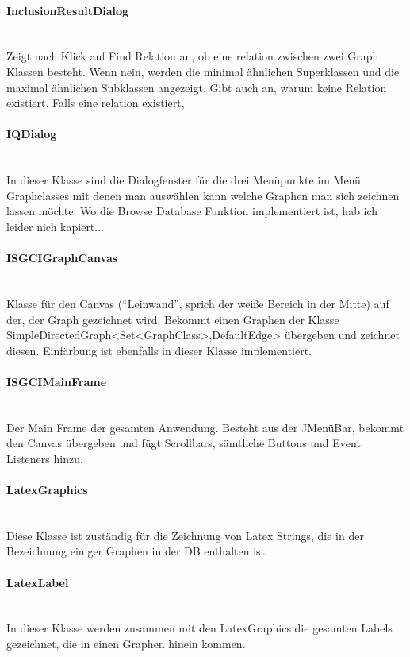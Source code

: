 \documentclass[10pt,a4paper]{article}
\begin{document}
\paragraph{InclusionResultDialog}\ \\Zeigt nach Klick auf Find Relation an, ob eine relation zwischen zwei Graph Klassen besteht. Wenn nein, werden die minimal ähnlichen Superklassen und die maximal ähnlichen Subklassen angezeigt. Gibt auch an, warum keine Relation existiert. Falls eine relation existiert, 

\paragraph{IQDialog}\ \\In dieser Klasse sind die Dialogfenster für die drei Menüpunkte im Menü Graphclasses mit denen man auswählen kann welche Graphen man sich zeichnen lassen möchte. Wo die Browse Database Funktion implementiert ist, hab ich leider nich kapiert...

\paragraph{ISGCIGraphCanvas}\ \\Klasse für den Canvas ("`Leinwand"', sprich der weiße Bereich in der Mitte) auf der, der Graph gezeichnet wird. Bekommt einen Graphen der Klasse SimpleDirectedGraph<Set<GraphClass>,DefaultEdge> übergeben und zeichnet diesen. Einfärbung ist ebenfalls in dieser Klasse implementiert.

\paragraph{ISGCIMainFrame}\ \\Der Main Frame der gesamten Anwendung. Besteht aus der JMenüBar, bekommt den Canvas übergeben und fügt Scrollbars, sämtliche Buttons und Event Listeners hinzu.

\paragraph{LatexGraphics}\ \\Diese Klasse ist zuständig für die Zeichnung von Latex Strings, die in der Bezeichnung einiger Graphen in der DB enthalten ist.

\paragraph{LatexLabel}\ \\In dieser Klasse werden zusammen mit den LatexGraphics die gesamten Labels gezeichnet, die in einen Graphen hinein kommen.
\end{document}
